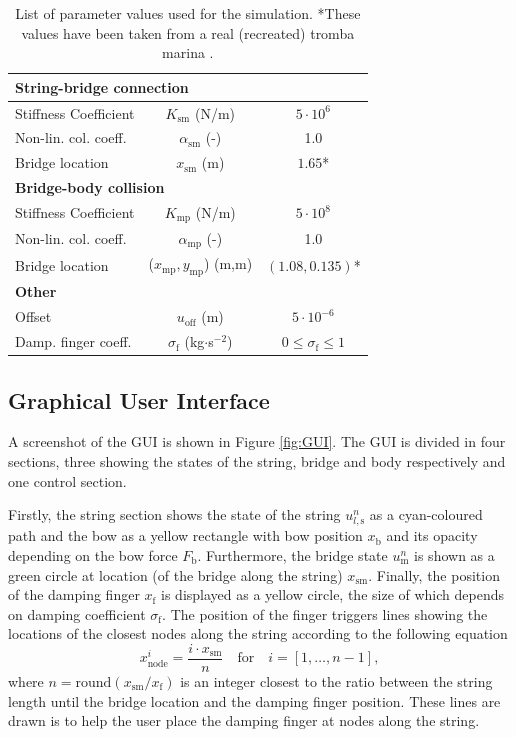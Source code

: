 \documentclass[dvipsnames, pdftex]{article}
\begin{document}
\begin{table}[t]
\begin{center}
\begin{tabular}{|l|c|c|}
    \multicolumn{3}{|l|}{\bf String-bridge connection}\\\hline
    Stiffness Coefficient & $K_\text{sm}$ (N/m) & $5\cdot10^{6}$\\
    Non-lin. col. coeff. &$\alpha_\text{sm}$ (-) & 1.0\\
    Bridge location & $x_\text{sm}$ (m)& $1.65$*\\
    \hline
    \multicolumn{3}{|l|}{\bf Bridge-body collision}\\\hline
    Stiffness Coefficient & $K_\text{mp}$ (N/m) & $5\cdot10^{8}$\\
    Non-lin. col. coeff. &$\alpha_\text{mp}$ (-) & 1.0\\
    Bridge location & ($x_\text{mp},y_\text{mp}$) (m,m)& $(1.08,0.135)$*\\\hline
    \multicolumn{3}{|l|}{\bf Other}\\\hline
    Offset & $u_\text{off}$ (m) & $5\cdot 10^{-6}$\\
    Damp. finger coeff. &$\sigma_\text{f}$ (kg$\cdot$s$^{-2}$)&$0\leq \sigma_\text{f} \leq 1$\\
    \hline
\end{tabular}
\caption{List of parameter values used for the simulation. *These values have been taken from a real (recreated) tromba marina \cite{Baldwin2016:SMC2020}.}
\end{center}
\end{table}

\subsection{Graphical User Interface}\label{sec:GUI}
A screenshot of the GUI is shown in Figure \ref{fig:GUI}. The GUI is divided in four sections, three showing the states of the string, bridge and body respectively and one control section. 

 Firstly, the string section shows the state of the string $u_{l,\text{s}}^n$ as a cyan-coloured path and the bow as a yellow rectangle with bow position $x_\text{b}$ and its opacity depending on the bow force $F_\text{b}$. Furthermore, the bridge state $u_\text{m}^n$ is shown as a green circle at location (of the bridge along the string) $x_\text{sm}$. Finally, the position of the damping finger $x_\text{f}$ is displayed as a yellow circle, the size of which depends on damping coefficient $\sigma_\text{f}$. The position of the finger triggers lines showing the locations of the closest nodes along the string according to the following equation
\begin{equation}
    x_\text{node}^i = \frac{i\cdot x_\text{sm}}{n}\quad \text{for} \quad i = [1,\hdots,n-1],
\end{equation}
where $n = \text{round} (x_\text{sm}/x_\text{f})$ is an integer closest to the ratio between the string length until the bridge location and the damping finger position. These lines are drawn is to help the user place the damping finger at nodes along the string.
\end{document}
